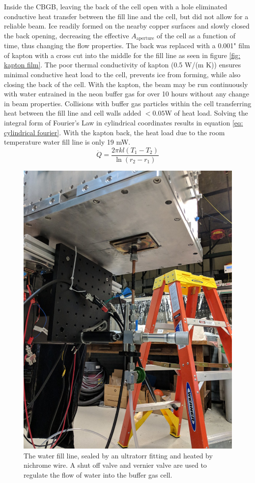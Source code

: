 Inside the CBGB, leaving the back of the cell open with a hole eliminated conductive heat transfer between the fill line and the cell, but did not allow for a reliable beam. Ice readily formed on the nearby copper surfaces and slowly closed the back opening, decreasing the effective $A_{\mathrm{aperture}}$ of the cell as a function of time, thus changing the flow properties. The back was replaced with a 0.001" film of kapton with a cross cut into the middle for the fill line as seen in figure \ref{fig: kapton film}. The poor thermal conductivity of kapton (0.5 W/(m K)) ensures minimal conductive heat load to the cell, prevents ice from forming, while also closing the back of the cell. With the kapton, the beam may be run continuously with water entrained in the neon buffer gas for over 10 hours without any change in beam properties. Collisions with buffer gas particles within the cell transferring heat between the fill line and cell walls added $<0.05$W of heat load. Solving the integral form of Fourier's Law in cylindrical coordinates results in equation \ref{eq: cylindrical fourier}. With the kapton back, the heat load due to the room temperature water fill line is only 19 mW.
\begin{equation}
	\dot{Q} = \frac{2 \pi k l (T_1 - T_2)}{\ln(r_2 - r_1)}
	\label{eq: cylindrical fourier}
\end{equation}

\begin{figure}[H]
	\centering
	\includegraphics[width=.5\textwidth]{images/CBGB_water_fill_outside.jpg}
	\caption{The water fill line, sealed by an ultratorr fitting and heated by nichrome wire. A shut off valve and vernier valve are used to regulate the flow of water into the buffer gas cell.}
	\label{fig: water fill bottom}
\end{figure}

